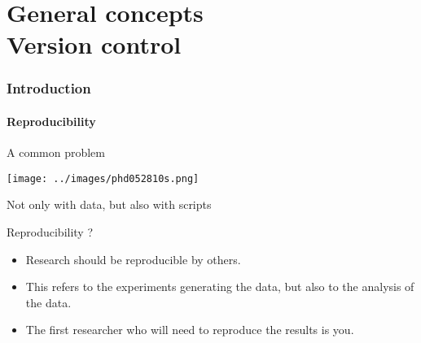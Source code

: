 \part{General concepts \protect\\
      Version control}
      
\frame{\partpage}

    
    
\section{Introduction}



    \subsection{Reproducibility}



\begin{frame}{A common problem}

    \begin{center}
    
        \texttt{[image: ../images/phd052810s.png]}
    
        \pause
    
        Not only with data, but also with scripts

    \end{center}
    
        
\end{frame}


\begin{frame}{Reproducibility ?}
    
    \begin{itemize}
        
        \item Research should be reproducible by others.
        
        \pause
        
        \item This refers to the experiments generating the data, but also 
          to the analysis of the data.
          
        \pause
        
        \item The first researcher who will need to reproduce the results is
          you.
        
    \end{itemize}
    
\end{frame}



